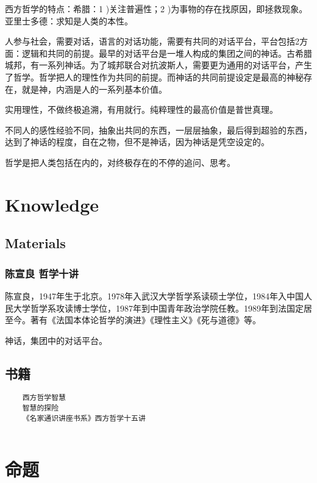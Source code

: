 \documentclass[UTF8]{../RepresentationUniverse}
\begin{document}
西方哲学的特点：希腊：1 )关注普遍性；2 )为事物的存在找原因，即拯救现象。
亚里士多德：求知是人类的本性。


人参与社会，需要对话，语言的对话功能，需要有共同的对话平台，平台包括2方面：逻辑和共同的前提。最早的对话平台是一堆人构成的集团之间的神话。古希腊城邦，有一系列神话。为了城邦联合对抗波斯人，需要更为通用的对话平台，产生了哲学。哲学把人的理性作为共同的前提。而神话的共同前提设定是最高的神秘存在，就是神，内涵是人的一系列基本价值。

实用理性，不做终极追溯，有用就行。纯粹理性的最高价值是普世真理。

不同人的感性经验不同，抽象出共同的东西，一层层抽象，最后得到超验的东西，达到了神话的程度，自在之物，但不是神话，因为神话是凭空设定的。

哲学是把人类包括在内的，对终极存在的不停的追问、思考。

\section{Knowledge}

\subsection{Materials}

\subsubsection{ 陈宣良 哲学十讲}
陈宣良，1947年生于北京。1978年入武汉大学哲学系读硕士学位，1984年入中国人民大学哲学系攻读博士学位，1987年到中国青年政治学院任教。1989年到法国定居至今。著有《法国本体论哲学的演进》《理性主义》《死与道德》等。

神话，集团中的对话平台。


\subsection{书籍}

\begin{lstlisting}
    西方哲学智慧
    智慧的探险
    《名家通识讲座书系》西方哲学十五讲
 
 \end{lstlisting}





\section{命题}
\end{document}
